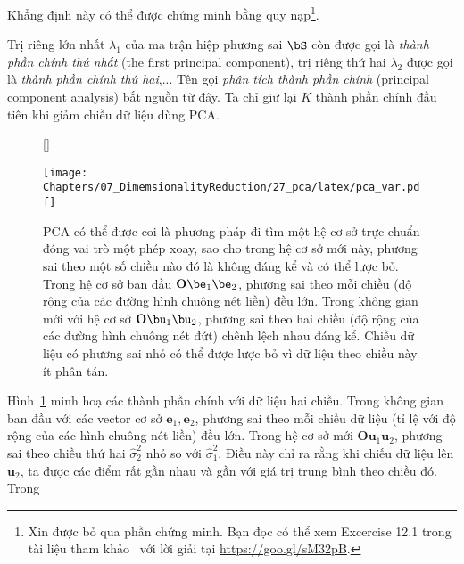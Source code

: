 Khẳng định này có thể được chứng minh bằng quy nạp\footnote{Xin được bỏ qua
phần chứng minh. Bạn đọc có thể xem Excercise 12.1 trong tài liệu tham
khảo~\cite{bishop2006pattern} với lời giải tại \url{https://goo.gl/sM32pB}.}.

Trị riêng lớn nhất $\lambda_1$ của ma trận hiệp phương sai $\bS$ còn được gọi
là \textit{thành
phần chính thứ nhất} ({the first principal component}), trị riêng thứ hai
$\lambda_2$ được gọi là \textit{thành phần chính thứ hai},... Tên gọi
\textit{phân tích thành phần chính} ({principal component analysis}) bắt
nguồn từ đây. Ta chỉ giữ lại $K$ thành phần chính đầu tiên khi giảm chiều dữ
liệu dùng PCA. 

\begin{figure}[t]
   
   
    [\FBwidth]
    {\caption{ PCA có thể được coi là phương pháp đi tìm một hệ cơ sở trực chuẩn
    đóng vai trò một phép xoay, sao cho trong hệ cơ sở mới này, phương sai theo
    một số chiều nào đó là không đáng kể và có thể lược bỏ. Trong hệ cơ sở ban đầu
    $\mathbf{O}\be_1\be_2$, phương sai theo mỗi chiều (độ rộng của các đường
    hình chuông nét liền) đều lớn. Trong không gian mới với hệ cơ sở
    $\mathbf{O}\bu_1\bu_2$, phương sai theo hai chiều (độ rộng của các đường
    hình chuông nét đứt) chênh lệch nhau đáng kể. Chiều dữ liệu có phương sai nhỏ
    có thể được lược bỏ vì dữ liệu theo chiều này ít phân tán. }
    \label{fig:27_4}}
    { %
   
    \texttt{[image: Chapters/07\_DimemsionalityReduction/27\_pca/latex/pca\_var.pdf]}
    }
\end{figure}
Hình~\ref{fig:27_4} minh hoạ các thành phần chính với dữ liệu hai chiều.
Trong không gian ban đầu với các vector cơ sở $\mathbf{e}_1,
\mathbf{e}_2$, phương sai theo mỗi chiều dữ liệu (tỉ lệ với độ rộng của các hình chuông
nét liền) đều lớn. Trong hệ cơ sở mới $\mathbf{O}\mathbf{u}_1\mathbf{u}_2$,
phương sai theo chiều thứ hai $\hat{\sigma}_2^2$ nhỏ so với
$\hat{\sigma}_1^2$. Điều này chỉ ra rằng khi chiếu dữ liệu lên $\mathbf{u}_2$, ta
được các điểm rất gần nhau và gần với giá trị trung bình theo chiều đó. Trong

